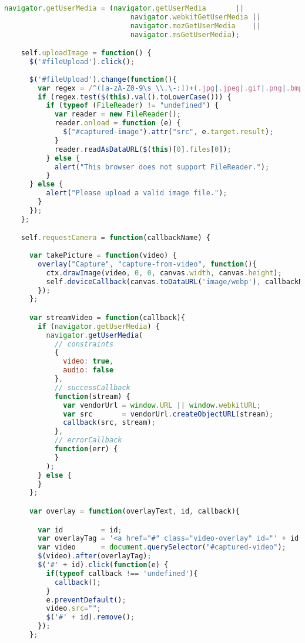 \begin{lstlisting}[language=JavaScript]
    navigator.getUserMedia = (navigator.getUserMedia       ||
                              navigator.webkitGetUserMedia ||
                              navigator.mozGetUserMedia    ||
                              navigator.msGetUserMedia);

    self.uploadImage = function() {
      $('#fileUpload').click();
      
      $('#fileUpload').change(function(){
        var regex = /^([a-zA-Z0-9\s_\\.\-:])+(.jpg|.jpeg|.gif|.png|.bmp)$/;
        if (regex.test($(this).val().toLowerCase())) {
          if (typeof (FileReader) != "undefined") {
            var reader = new FileReader();
            reader.onload = function (e) {
              $("#captured-image").attr("src", e.target.result);
            }
            reader.readAsDataURL($(this)[0].files[0]);
          } else {
            alert("This browser does not support FileReader.");
          }
      } else {
          alert("Please upload a valid image file.");
        }
      });
    };

    self.requestCamera = function(callbackName) {
      
      var takePicture = function(video) {
        overlay("Capture", "capture-from-video", function(){
          ctx.drawImage(video, 0, 0, canvas.width, canvas.height);
          self.deviceCallback(canvas.toDataURL('image/webp'), callbackName);
        });
      };

      var streamVideo = function(callback){
        if (navigator.getUserMedia) {
          navigator.getUserMedia(
            // constraints
            {
              video: true,
              audio: false
            },
            // successCallback
            function(stream) {
              var vendorUrl = window.URL || window.webkitURL;
              var src       = vendorUrl.createObjectURL(stream);
              callback(src, stream);
            },
            // errorCallback
            function(err) {
            }
          );
        } else {
        }
      };

      var overlay = function(overlayText, id, callback){

        var id         = id;
        var overlayTag = '<a href="#" class="video-overlay" id="' + id + '">' + overlayText + '</a>';
        var video      = document.querySelector("#captured-video");
        $(video).after(overlayTag);
        $('#' + id).click(function(e) {
          if(typeof callback !== 'undefined'){
            callback();
          }
          e.preventDefault();
          video.src="";
          $('#' + id).remove();
        });
      };


\end{lstlisting}

